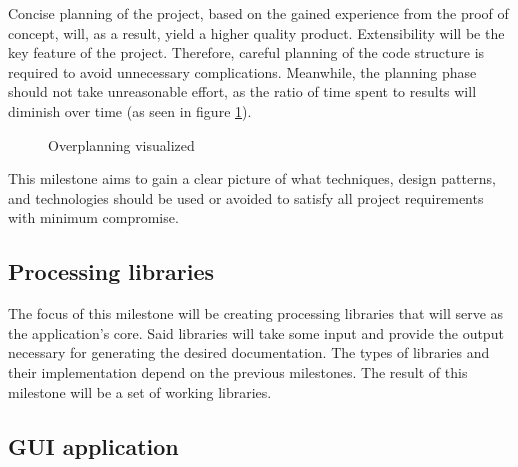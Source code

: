 Concise planning of the project, based on the gained experience from the proof of concept, will, as a result, yield a higher quality product.
Extensibility will be the key feature of the project. Therefore, careful planning of the code structure is required to avoid unnecessary complications.
Meanwhile, the planning phase should not take unreasonable effort, as the ratio of time spent to results will diminish over time (as seen in figure \ref{fig:overplanning}). \cite{ruparelia_stop_2016}

\begin{figure}[H]
    \centering
    \caption{Overplanning visualized}
    \label{fig:overplanning}
\end{figure}

This milestone aims to gain a clear picture of what techniques, design patterns, and technologies should be used or avoided to satisfy all project requirements with minimum compromise.

\subsection*{Processing libraries} \label{subSecProcessingLibs}

The focus of this milestone will be creating processing libraries that will serve as the application's core. Said libraries will take some input and provide the output necessary for generating the desired documentation. The types of libraries and their implementation depend on the previous milestones. The result of this milestone will be a set of working libraries.

\subsection*{GUI application} \label{subSecGuiApp}

